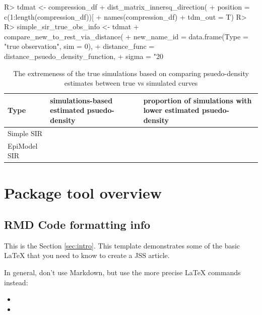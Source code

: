 \documentclass[
  shortnames]{jss}
\begin{document}
\begin{CodeChunk}
\begin{CodeInput}
R> tdmat <- compression_df %
+   dist_matrix_innersq_direction(
+     position = c(1:length(compression_df))[
+       names(compression_df) %
+     tdm_out = T)
R> 
R> simple_sir_true_obs_info <- tdmat %
+   compare_new_to_rest_via_distance(
+     new_name_id = data.frame(Type = "true observation", sim = 0),
+     distance_func = distance_psuedo_density_function, 
+     sigma = "20%
\end{CodeInput}
\end{CodeChunk}

\begin{CodeChunk}
\begin{table}[!h]

\caption{\label{tab:hags-extreme}The extremeness of the true simulations based on comparing psuedo-density estimates between true vs simulated curves}
\centering
\begin{tabular}[t]{l>{\raggedleft\arraybackslash}p{6cm}>{\raggedleft\arraybackslash}p{6cm}}
\toprule
Type & simulations-based estimated psuedo-density & proportion of simulations with lower estimated psuedo-density\\
\midrule
Simple SIR & 0.0036733 & 0.00\\
EpiModel SIR & 0.0149686 & 0.02\\
\bottomrule
\end{tabular}
\end{table}

\end{CodeChunk}

\section[Package overview]{Package tool overview}\label{sec:overview}

\hypertarget{rmd-code-formatting-info}{%
\subsection{RMD Code formatting info}\label{rmd-code-formatting-info}}

This is the Section \ref{sec:intro}. This template demonstrates some of
the basic LaTeX that you need to know to create a JSS article.

In general, don't use Markdown, but use the more precise LaTeX commands
instead:

\begin{itemize}
\item
\item
\end{itemize}
\end{document}
